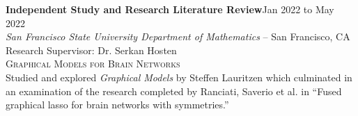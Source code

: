 \documentclass[hidelinks, 10pt]{article}
\begin{document}
{{    \begin{minipage}[ct]{0.9\linewidth}
        \textbf{Independent Study and Research Literature Review}\hfill Jan 2022 to May 2022\\
        \emph{San Francisco State University Department of Mathematics} -- San Francisco, CA\\
        Research Supervisor: Dr. Serkan Hosten\\
        {\textsc{Graphical Models for Brain Networks}}
        \vspace{1mm}\\
        Studied and explored \emph{Graphical Models} by Steffen Lauritzen which
        culminated in an examination of the research completed by Ranciati, Saverio et
        al. in ``Fused graphical lasso for brain networks with symmetries.''
    \end{minipage}

    \vspace{4mm}

}}
\end{document}
